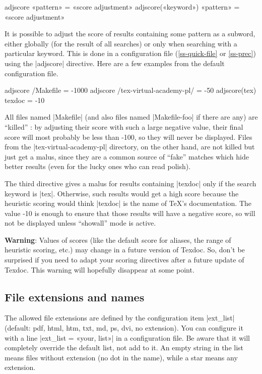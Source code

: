\documentclass[a4paper,oneside]{scrartcl}
\makeatletter
\newenvironment{htcode}
  {\SaveVerbatim[samepage, gobble=2]{verbmat}}
  {
    \endSaveVerbatim
    \par\medskip\noindent\hspace*{\parindent}%
    \BUseVerbatim{verbmat}%
    \par\medskip\@endpetrue
  }
\makeatother
\begin{document}
\begin{htcode}
  adjscore «pattern» = «score adjustment»
  adjscore(«keyword») «pattern» = «score adjustment»
\end{htcode}

It is possible to adjust the score of results containing some pattern as a
subword, either globally (for the result of all searches) or only when
searching with a particular keyword. This is done in a configuration file
(\ref{ss-quick-file} or \ref{ss-prec}) using the |adjscore| directive. Here are
a few examples from the default configuration file.

\begin{htcode}
  adjscore /Makefile = -1000
  adjscore /tex-virtual-academy-pl/ = -50
  adjscore(tex) texdoc = -10
\end{htcode}

All files named |Makefile| (and also files named |Makefile-foo| if there are
any) are ``killed'' : by adjusting their score with such a large negative
value, their final score will most probably be less than -100, so they will
never be displayed. Files from the |tex-virtual-academy-pl| directory, on the
other hand, are not killed but just get a malus, since they are a common
source of ``fake'' matches which hide better results (even for the lucky ones
who can read polish).

The third directive gives a malus for results containing |texdoc| only if the
search keyword is |tex|. Otherwise, such results would get a high score
because the heuristic scoring would think |texdoc| is the name of \TeX's
documentation. The value -10 is enough to ensure that those results will have
a negative score, so will not be displayed unless ``showall'' mode is active.

\textbf{Warning}: Values of scores (like the default score for aliases, the
range of heuristic scoring, etc.) may change in a future version of Texdoc.
So, don't be surprised if you need to adapt your scoring directives after a
future update of Texdoc. This warning will hopefully disappear at some point.

\subsection{File extensions and names}\label{ss-ext}

The allowed file extensions are defined by the configuration item |ext_list|
(default: pdf, html, htm, txt, md, ps, dvi, no extension). You can configure it
with a line |ext_list = «your, list»| in a configuration file. Be aware
that it will completely override the default list, not add to it. An empty
string in the list means files without extension (no dot in the name), while a
star means any extension.
\end{document}
